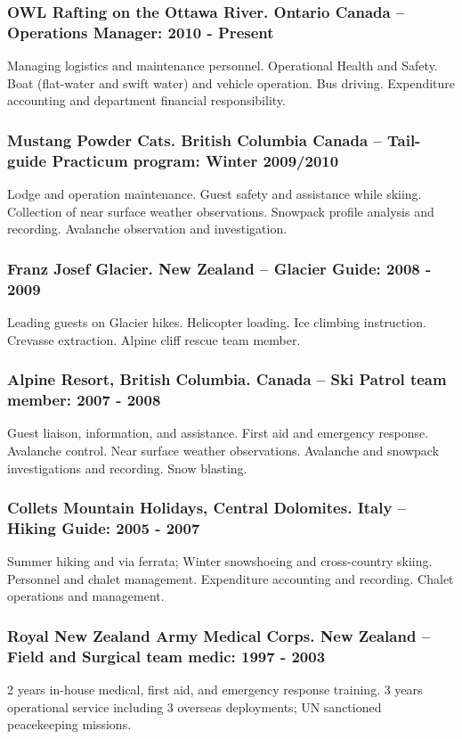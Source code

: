 \documentclass[]{article}
\begin{document}
\subsubsection*{OWL Rafting on the Ottawa River. Ontario Canada – Operations Manager: 2010 - Present}
Managing logistics and maintenance personnel. Operational Health and Safety. Boat (flat-water and swift water) and vehicle operation. Bus driving. Expenditure accounting and department financial responsibility.
\subsubsection*{Mustang Powder Cats. British Columbia Canada – Tail-guide Practicum program: Winter 2009/2010}
Lodge and operation maintenance. Guest safety and assistance while skiing. Collection of near surface weather observations. Snowpack profile analysis and recording. Avalanche observation and investigation. 
 \subsubsection*{Franz Josef Glacier. New Zealand – Glacier Guide: 2008 - 2009}
Leading guests on Glacier hikes. Helicopter loading. Ice climbing instruction. Crevasse extraction. Alpine
cliff rescue team member.
\subsubsection*{Alpine Resort, British Columbia. Canada – Ski Patrol team member: 2007 - 2008}
Guest liaison, information, and assistance. First aid and emergency response. Avalanche control. Near surface weather observations. Avalanche and snowpack investigations and recording. Snow blasting.
\subsubsection*{Collets Mountain Holidays, Central Dolomites. Italy – Hiking Guide: 2005 - 2007}
Summer hiking and via ferrata; Winter snowshoeing and cross-country skiing. Personnel and chalet management. Expenditure accounting and recording. Chalet operations and management.
\subsubsection*{Royal New Zealand Army Medical Corps. New Zealand – Field and Surgical team medic: 1997 - 2003}
2 years in-house medical, first aid, and emergency response training. 3 years operational service including 3 overseas deployments; UN sanctioned peacekeeping missions.
\end{document}

